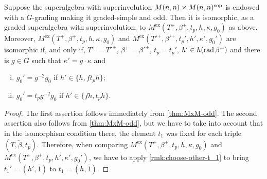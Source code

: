 \begin{cor}\label{cor:MxMsop-odd-only-G}
    Suppose the superalgebra with superinvolution $M(n,n) \times M(n,n)^{\mathrm{sop}}$ is endowed with a $G$-grading making it graded-simple and odd. 
    Then it is isomorphic, as a graded superalgebra with superinvolution, to $M^{\mathrm{ex}}(T^+, \beta^+, t_p, h, \kappa, g_0)$ as above. 
    Moreover, $M^{\mathrm{ex}}(T^+, \beta^+, t_p, h, \kappa, g_0)$ and $M^{\mathrm{ex}} (T'^+, \beta'^+, t_p',  h', \kappa', g_0')$ are isomorphic if, and only if, $T^+ =T'^+$, $\beta^+ = \beta'^+$, $t_p = t_p'$, $h' \in h (\operatorname{rad} \beta^+)$ and there is $g \in G$ such that $\kappa' = g\cdot\kappa$ and
    \begin{enumerate}[(i)]
        \item $g_0' = g^{-2}g_0$ if $h' \in \{ h, f t_p h\}$;
        \item $g_0' = t_p g^{-2}g_0$ if $h' \in \{ f h, t_p h\}$.
    \end{enumerate}
\end{cor}

\begin{proof}
    The first assertion follows immediately from \cref{thm:MxM-odd}. 
    The second assertion also follows from \cref{thm:MxM-odd}, but we have to take into account that in the isomorphism condition there, the element $t_1$ was fixed for each triple $(T, \tilde\beta, t_p)$. 
    Therefore, when comparing $M^{\mathrm{ex}}(T^+, \beta^+, t_p, h, \kappa, g_0)$ and $M^{\mathrm{ex}} (T^+, \beta^+, t_p,  h', \kappa', g_0')$, we have to apply \cref{rmk:choose-other-t_1} to bring 
    $t_1' = (h', \bar 1)$ to $t_1= (h, \bar 1)$. 
\end{proof}



